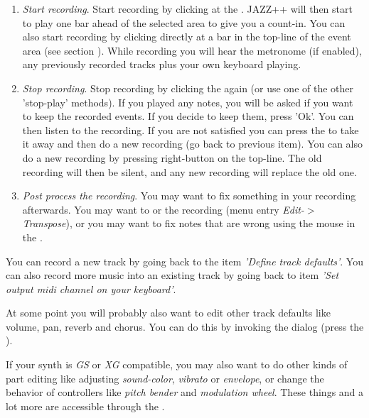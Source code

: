 \documentclass[letterpaper]{report}
\begin{document}
\begin{enumerate}
\item {\em Start recording}. Start recording by clicking at the
. JAZZ++ will then start to play one bar
ahead of the selected area to give you a count-in. You can also start
recording by clicking directly at a bar in the top-line of the event area
(see section ). While recording you will
hear the metronome (if enabled), any previously recorded tracks plus your own
keyboard playing.

\item {\em Stop recording}. Stop recording by clicking the
 again (or use one of the other 'stop-play'
methods). If you played any notes, you will be asked if you want
to keep the recorded events. If you decide to keep them, press 'Ok'. You can
then listen to the recording. If you are not satisfied you can press the
 to take it away and then do a new recording
(go back to previous item).
You can also do a new recording by pressing right-button on the top-line.
The old recording will then be silent, and any new recording will replace the
old one.

\item {\em Post process the recording}. You may want to fix something in your
recording afterwards. You may want to  or
 the recording (menu entry {\em Edit-$>$Transpose}),
or you may want to fix notes that are wrong using the mouse in the
.

\end{enumerate}

You can record a new track by going back to the item
{\em 'Define track defaults'}. You can also record more
music into an existing track by going back to item
{\em 'Set output midi channel on your keyboard'}.

At some point you will probably also want to edit other track defaults like
volume, pan, reverb and chorus. You can do this by invoking the
 dialog (press the ).

If your synth is {\em GS} or {\em XG} compatible, you may also want to do other kinds of
part editing like adjusting {\em sound-color}, {\em vibrato} or {\em envelope},
or change the behavior of controllers like {\em pitch bender} and
{\em modulation wheel}. These things and a lot more are accessible through the
.
\end{document}

